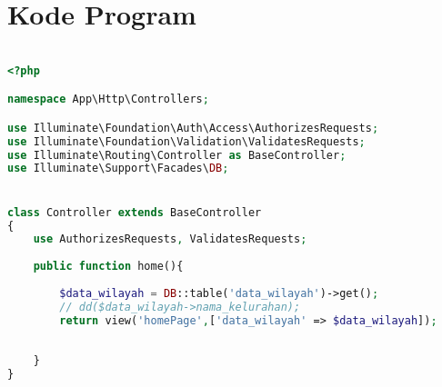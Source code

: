 \chapter{Kode Program}
\label{lamp:A}

%
%
%


\begin{lstlisting}[language=PHP, caption=Controller.php]

<?php

namespace App\Http\Controllers;

use Illuminate\Foundation\Auth\Access\AuthorizesRequests;
use Illuminate\Foundation\Validation\ValidatesRequests;
use Illuminate\Routing\Controller as BaseController;
use Illuminate\Support\Facades\DB;


class Controller extends BaseController
{
	use AuthorizesRequests, ValidatesRequests;
	
	public function home(){
		
		$data_wilayah = DB::table('data_wilayah')->get();
		// dd($data_wilayah->nama_kelurahan);
		return view('homePage',['data_wilayah' => $data_wilayah]);
		
		
	}
}



\end{lstlisting}

